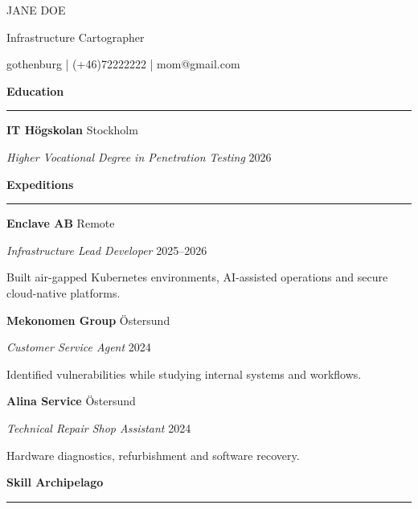 \documentclass[10pt,a4paper]{article}
\newcommand{\terrainsection}[1]
{

\vspace{1em}

{\Huge
\displayfont
\bfseries
\textcolor{peak}{#1}
}

\vspace{0.2em}

{\color{ridge}
\rule{\linewidth}{1pt}
}

\vspace{0.5em}

}
\newcommand{\landmark}[4]
{

\vspace{0.6em}

{\Large\bfseries\color{accent} #1}
\hfill
{\color{fog} #2}

\vspace{0.2em}

{\itshape\color{peak} #3}
\hfill
{\color{ridge} #4}

\vspace{0.3em}

}
\begin{document}

\vspace*{1cm}

{\displayfont

{\fontsize{42}{42}\selectfont
\color{peak}
JANE DOE

}

\vspace{0.2cm}

{\Large
\color{ridge}
Infrastructure Cartographer
}

\vspace{0.2cm}

{\monofont
\color{fog}
gothenburg
|
(+46)72222222
|
mom@gmail.com
}

}

\vspace{1.5cm}


\terrainsection{Education}

\landmark
{IT Högskolan}
{Stockholm}
{Higher Vocational Degree in Penetration Testing}
{2026}


\terrainsection{Expeditions}

\landmark
{Enclave AB}
{Remote}
{Infrastructure Lead Developer}
{2025--2026}

Built air-gapped Kubernetes environments, AI-assisted operations and secure cloud-native platforms.

\vspace{0.4cm}

\landmark
{Mekonomen Group}
{Östersund}
{Customer Service Agent}
{2024}

Identified vulnerabilities while studying internal systems and workflows.

\vspace{0.4cm}

\landmark
{Alina Service}
{Östersund}
{Technical Repair Shop Assistant}
{2024}

Hardware diagnostics, refurbishment and software recovery.


\terrainsection{Skill Archipelago}
\end{document}
